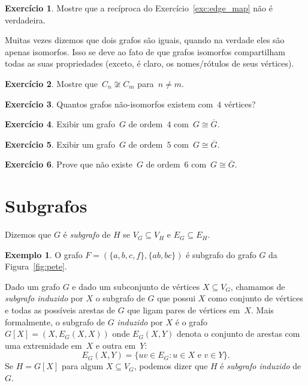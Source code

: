 \documentclass[12pt, a4paper]{article}
\theoremstyle{definition}
\newtheorem{exem}[teor]{Exemplo}
\newtheorem{exer}{Exercício}
\begin{document}
\begin{exer}
  Mostre que a recíproca do Exercício~\ref{exc:edge_map} não é verdadeira.
\end{exer}

\noindent Muitas vezes dizemos que dois grafos são iguais, quando na verdade eles são apenas isomorfos. Isso se deve ao fato de que grafos isomorfos compartilham todas as suas propriedades (exceto, é claro, os nomes/rótulos de seus vértices).


\begin{exer}
  Mostre que~$C_n \not\cong C_m$ para~$n\neq m$. 
\end{exer}

\begin{exer}
  Quantos grafos não-isomorfos existem com~$4$ vértices?
\end{exer}

\begin{exer}
  Exibir um grafo~$G$ de ordem~$4$ com~$G \cong \overline{G}$.
\end{exer}

\begin{exer}
  Exibir um grafo~$G$ de ordem~$5$ com~$G \cong \overline{G}$.
\end{exer}

\begin{exer}
  Prove que não existe~$G$ de ordem~$6$ com~$G \cong \overline{G}$.
\end{exer}

\section{Subgrafos}

Dizemos que $G$ é \emph{subgrafo} de $H$ se $V_G \subseteq V_H$ e $E_G \subseteq E_H$.

\begin{exem}
\label{exem:subgraph}
O grafo $F = (\{a, b, c, f\}, \{ab, bc\})$ é subgrafo do grafo $G$ da Figura~\ref{fig:pete}.
\end{exem}

\noindent Dado um grafo $G$ e dado um subconjunto de vértices $X \subseteq V_G$, chamamos de \emph{subgrafo induzido} por $X$ o subgrafo de $G$ que possui $X$ como conjunto de vértices e todas as possíveis arestas de $G$ que ligam pares de vértices em~$X$. Mais formalmente, o subgrafo de $G$ \emph{induzido} por $X$ é o grafo $G[X] = (X,E_G(X,X))$ onde $E_G(X,Y)$ denota o conjunto de arestas com uma extremidade em~$X$ e outra em~$Y$:
\[ E_G(X,Y) = \{ uv \in E_G \colon u \in X \text{ e } v \in Y\}. \]
Se $H = G[X]$ para algum $X \subseteq V_G$, podemos dizer que $H$ é \emph{subgrafo induzido} de $G$.
\end{document}
